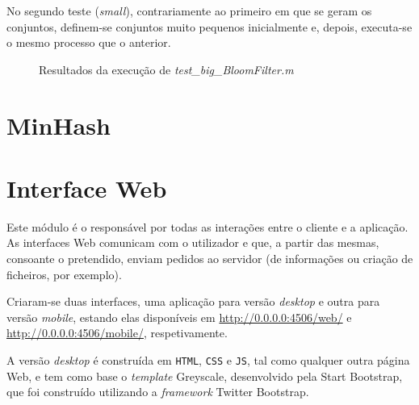 \documentclass[a4paper,11pt,openright,oneside]{report}
\begin{document}
No segundo teste (\textit{small}), contrariamente ao primeiro em que se geram os conjuntos, definem-se conjuntos muito pequenos inicialmente e, depois, executa-se o mesmo processo que o anterior.

\begin{figure}[ht]	
\center
{}
\caption{Resultados da execução de \textit{test_big_BloomFilter.m}}
\label{fig:testbigbloom}
\end{figure}


\section{MinHash}
\label{sec.minhash}












\section{Interface Web}
\label{sec.web}

Este módulo é o responsável por todas as interações entre o cliente e a aplicação. As interfaces Web comunicam com o utilizador e que, a partir das mesmas, consoante o pretendido, enviam pedidos ao servidor (de informações ou criação de ficheiros, por exemplo).

Criaram-se duas interfaces, uma aplicação para versão \textit{desktop} e outra para versão \textit{mobile}, estando elas disponíveis em \url{http://0.0.0.0:4506/web/} e \url{http://0.0.0.0:4506/mobile/}, respetivamente.

A versão \textit{desktop} é construída em \verb|HTML|, \verb|CSS| e \verb|JS|, tal como qualquer outra página Web, e tem como base o \textit{template} Greyscale, desenvolvido pela Start Bootstrap, que foi construído utilizando a \textit{framework} Twitter Bootstrap.
\end{document}
